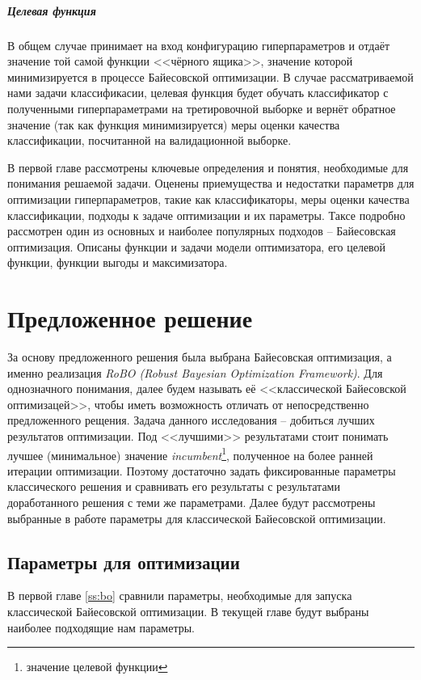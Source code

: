 \documentclass[times,specification,annotation]{itmo-student-thesis}
\begin{document}
	\paragraph{Целевая функция} В общем случае принимает на вход конфигурацию гиперпараметров и отдаёт значение той самой функции <<чёрного ящика>>\cite{koh2017understanding}, значение которой минимизируется в процессе Байесовской оптимизации. В случае рассматриваемой нами задачи классификасии, целевая функция будет обучать классификатор с полученными гиперпараметрами на третировочной выборке и вернёт обратное значение (так как функция минимизируется) меры оценки качества классификации, посчитанной на валидационной выборке. \label{pr:objf}
	
	\chapterconclusion
	В первой главе рассмотрены ключевые определения и понятия, необходимые для понимания решаемой задачи. Оценены приемущества и недостатки параметрв для оптимизации гиперпараметров, такие как классификаторы, меры оценки качества классификации, подходы к задаче оптимизации и их параметры. Таксе подробно рассмотрен один из основных и наиболее популярных подходов -- Байесовская оптимизация. Описаны функции и задачи модели оптимизатора, его целевой функции, функции выгоды и максимизатора.
	
	\chapter{Предложенное решение}
	За основу предложенного решения была выбрана Байесовская оптимизация, а именно реализация \textit{RoBO (Robust Bayesian Optimization Framework)}\cite{klein-bayesopt17}. Для однозначного понимания, далее будем называть её <<классической Байесовской оптимизацей>>, чтобы иметь возможность отличать от непосредственно предложенного рещения. Задача данного исследования -- добиться лучших результатов оптимизации. Под <<лучшими>> результатами стоит понимать лучшее (минимальное) значение \textit{incumbent}\footnote{значение целевой функции}, полученное на более ранней итерации оптимизации. Поэтому достаточно задать фиксированные параметры классического решения и сравнивать его результаты с результатами доработанного решения с теми же параметрами. Далее будут рассмотрены выбранные в работе параметры для классической Байесовской оптимизации.
	
	\section{Параметры для оптимизации}
	В первой главе \ref{ss:bo} сравнили параметры, необходимые для запуска классической Байесовской оптимизации. В текущей главе будут выбраны наиболее подходящие нам параметры.
\end{document}
